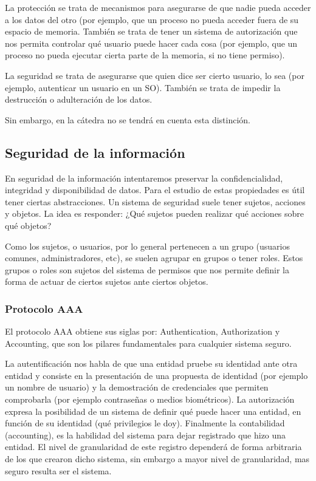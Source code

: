 \documentclass{article}
\begin{document}
La protección se trata de mecanismos para asegurarse de que nadie pueda acceder a los datos del otro (por ejemplo, que un proceso no pueda acceder fuera de su espacio de memoria. También se trata de tener un sistema de autorización que nos permita controlar qué usuario puede hacer cada cosa (por ejemplo, que un proceso no pueda ejecutar cierta parte de la memoria, si no tiene permiso).

La seguridad se trata de asegurarse que quien dice ser cierto usuario, lo sea (por ejemplo, autenticar un usuario en un SO). También se trata de impedir la destrucción o adulteración de los datos.

Sin embargo, en la cátedra no se tendrá en cuenta esta distinción.

\subsection{Seguridad de la información}

En seguridad de la información intentaremos preservar la confidencialidad, integridad y disponibilidad de datos. Para el estudio de estas propiedades es útil tener ciertas abstracciones. Un sistema de seguridad suele tener sujetos, acciones y objetos. La idea es responder: ¿Qué sujetos pueden realizar qué acciones sobre qué objetos?

Como los sujetos, o usuarios, por lo general pertenecen a un grupo (usuarios comunes, administradores, etc), se suelen agrupar en grupos o tener roles. Estos grupos o roles son sujetos del sistema de permisos que nos permite definir la forma de actuar de ciertos sujetos ante ciertos objetos.

\subsubsection{Protocolo AAA}

El protocolo AAA obtiene sus siglas por: Authentication, Authorization y Accounting, que son los pilares fundamentales para cualquier sistema seguro. 

La autentificación nos habla de que una entidad pruebe su identidad ante otra entidad y consiste en la presentación de una propuesta de identidad (por ejemplo un nombre de usuario) y la demostración de credenciales que permiten comprobarla (por ejemplo contraseñas o medios biométricos). La autorización expresa la posibilidad de un sistema de definir qué puede hacer una entidad, en función de su identidad (qué privilegios le doy). Finalmente la contabilidad (accounting), es la habilidad del sistema para dejar registrado que hizo una entidad. El nivel de granularidad de este registro dependerá de forma arbitraria de los que crearon dicho sistema, sin embargo a mayor nivel de granularidad, mas seguro resulta ser el sistema.
\end{document}
